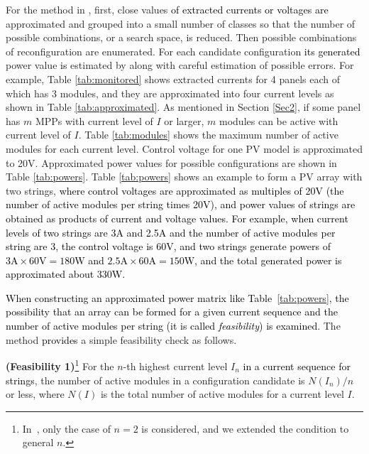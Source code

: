 \documentclass[conference]{pvsctran}
\newcommand{\michiko}{\textcolor{black}}
\newcommand{\zhao}{\textcolor{black}}
\begin{document}
For the method in \cite{orozco2016optimized}, first, close values \michiko{of extracted currents or voltages are} approximated and grouped into a small number of classes so that the number of possible combinations, or a search space, is reduced.
Then possible combinations of reconfiguration are enumerated.
For each candidate configuration \michiko{its generated} power value \michiko{is} estimated by \cite{orozco2015fast} along with careful estimation of possible errors.
For example, Table \ref{tab:monitored} shows extracted currents for 4 panels each of which has 3 modules, and they are approximated into four current levels as shown in Table \ref{tab:approximated}. 
As mentioned in Section \ref{Sec2}, if some panel has $m$ MPPs with current level of $I$ or larger, $m$ modules can be active with current level of $I$. 
Table \ref{tab:modules} shows the maximum number of active modules for each current level.
Control voltage for one PV model is approximated to 20V.
Approximated power values for possible configurations are shown in Table \ref{tab:powers}. 
Table \ref{tab:powers} shows an example to form a PV array with two strings,
\michiko{where control voltages are approximated as multiples of 20V (the number of active modules per string times 20V), and power values of strings are obtained as products of current and voltage values. For example, when current levels of two strings are 3A and 2.5A and the number of active modules per string \zhao{are} 3, the control voltage is 60V, and two strings generate powers of $3\mbox{A} \times 60\mbox{V} = 180\mbox{W}$ and $2.5\mbox{A} \times 60\mbox{A} = 150\mbox{W}$, and the total generated power is \zhao{approximated about} 330W.}

\michiko{When constructing an approximated power matrix like Table~\ref{tab:powers}, the possibility that an array can be formed for a given current sequence and the number of active modules per string (it is called \textit{feasibility}) is examined.}
The method \michiko{provides} a simple feasibility check as follows. 

\textbf{(Feasibility 1)}\footnote{In~\cite{orozco2016optimized}, only the case of $n=2$ is considered, and we extended the condition to general $n$. }%
For the $n$-th highest current level $I_{n}$ \michiko{in a current sequence for strings}, the number of active modules in a configuration candidate is $N(I_{n}) / n$ or less,
where $N(I)$ is the total number of active modules for a current level $I$. 
\end{document}
